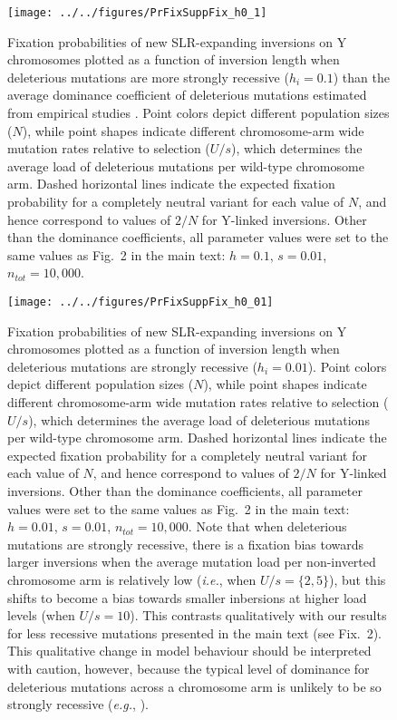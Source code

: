 \documentclass{article}
\begin{document}
\begin{appendices}
 \begin{figure}[htbp]
 \centering
 \texttt{[image: ../../figures/PrFixSuppFix\_h0\_1]}
 \caption{Fixation probabilities of new SLR-expanding inversions on Y chromosomes plotted as a function of inversion length when deleterious mutations are more strongly recessive ($h_i = 0.1$) than the average dominance coefficient of deleterious mutations estimated from empirical studies \citep{Manna2011, AgrawalWhitlock2012}. Point colors depict different population sizes ($N$), while point shapes indicate different chromosome-arm wide mutation rates relative to selection ($U/s$), which determines the average load of deleterious mutations per wild-type chromosome arm. Dashed horizontal lines indicate the expected fixation probability for a completely neutral variant for each value of $N$, and hence correspond to values of $2/N$ for Y-linked inversions. Other than the dominance coefficients, all parameter values were set to the same values as Fig.~2 in the main text: $h = 0.1$, $s = 0.01$, $n_{tot} = 10,000$.}
 \label{fig:PrFix_lessRecessive}
 \end{figure}


 \begin{figure}[htbp]
 \centering
 \texttt{[image: ../../figures/PrFixSuppFix\_h0\_01]}
 \caption{Fixation probabilities of new SLR-expanding inversions on Y chromosomes plotted as a function of inversion length when deleterious mutations are strongly recessive ($h_i = 0.01$). Point colors depict different population sizes ($N$), while point shapes indicate different chromosome-arm wide mutation rates relative to selection ($U/s$), which determines the average load of deleterious mutations per wild-type chromosome arm. Dashed horizontal lines indicate the expected fixation probability for a completely neutral variant for each value of $N$, and hence correspond to values of $2/N$ for Y-linked inversions. Other than the dominance coefficients, all parameter values were set to the same values as Fig.~2 in the main text: $h = 0.01$, $s = 0.01$, $n_{tot} = 10,000$. Note that when deleterious mutations are strongly recessive, there is a fixation bias towards larger inversions when the average mutation load per non-inverted chromosome arm is relatively low ({\itshape i.e.}, when $U/s = \{2, 5\}$), but this shifts to become a bias towards smaller inbersions at higher load levels (when $U/s = 10$). This contrasts qualitatively with our results for less recessive mutations presented in the main text (see Fix.~2). This qualitative change in model behaviour should be interpreted with caution, however, because the typical level of dominance for deleterious mutations across a chromosome arm is unlikely to be so strongly recessive ({\itshape e.g.}, \citealt{Manna2011, AgrawalWhitlock2012}). }
 \label{fig:PrFix_strongRecessive}
 \end{figure}




\end{appendices}
\end{document}
